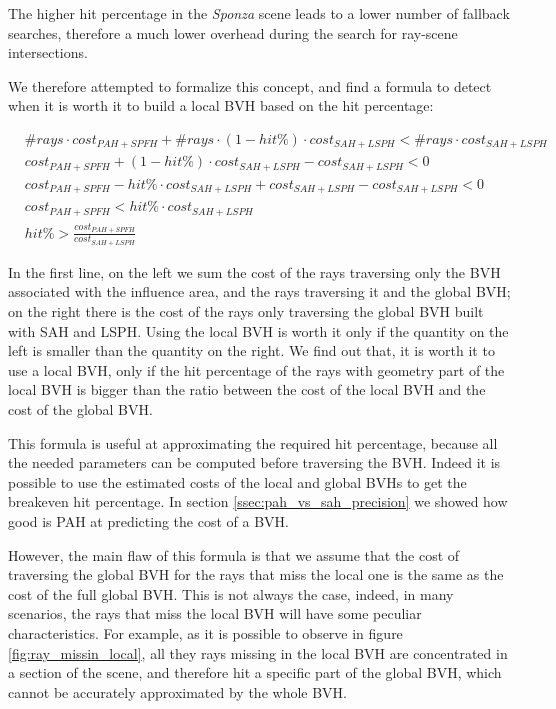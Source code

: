 \documentclass{PoliMi_MasterThesis}
\begin{document}
The higher hit percentage in the \textit{Sponza} scene leads to a lower number of fallback searches, therefore a much lower overhead during the search for ray-scene intersections.

We therefore attempted to formalize this concept, and find a formula to detect when it is worth it to build a local BVH based on the hit percentage:

\begin{subequations}
	\begin{align*}
		&\#rays \cdot cost_{PAH+SPFH} + \#rays \cdot (1-hit\%) \cdot cost_{SAH+LSPH} < \#rays \cdot cost_{SAH+LSPH}\\
		&cost_{PAH+SPFH} + (1-hit\%) \cdot cost_{SAH+LSPH} - cost_{SAH+LSPH} < 0\\
		&cost_{PAH+SPFH} - hit\% \cdot cost_{SAH+LSPH} + cost_{SAH+LSPH} - cost_{SAH+LSPH} < 0\\
		&cost_{PAH+SPFH} < hit\% \cdot cost_{SAH+LSPH}\\
		&hit\% > \frac{cost_{PAH+SPFH}}{cost_{SAH+LSPH}}
	\end{align*}
\end{subequations}

In the first line, on the left we sum the cost of the rays traversing only the BVH associated with the influence area, and the rays traversing it and the global BVH; on the right there is the cost of the rays only traversing the global BVH built with SAH and LSPH. Using the local BVH is worth it only if the quantity on the left is smaller than the quantity on the right. We find out that, it is worth it to use a local BVH, only if the hit percentage of the rays with geometry part of the local BVH is bigger than the ratio between the cost of the local BVH and the cost of the global BVH.

This formula is useful at approximating the required hit percentage, because all the needed parameters can be computed before traversing the BVH. Indeed it is possible to use the estimated costs of the local and global BVHs to get the breakeven hit percentage. In section \ref{ssec:pah_vs_sah_precision} we showed how good is PAH at predicting the cost of a BVH.

However, the main flaw of this formula is that we assume that the cost of traversing the global BVH for the rays that miss the local one is the same as the cost of the full global BVH. This is not always the case, indeed, in many scenarios, the rays that miss the local BVH will have some peculiar characteristics. For example, as it is possible to observe in figure \ref{fig:ray_missin_local}, all they rays missing in the local BVH are concentrated in a section of the scene, and therefore hit a specific part of the global BVH, which cannot be accurately approximated by the whole BVH.
\end{document}
